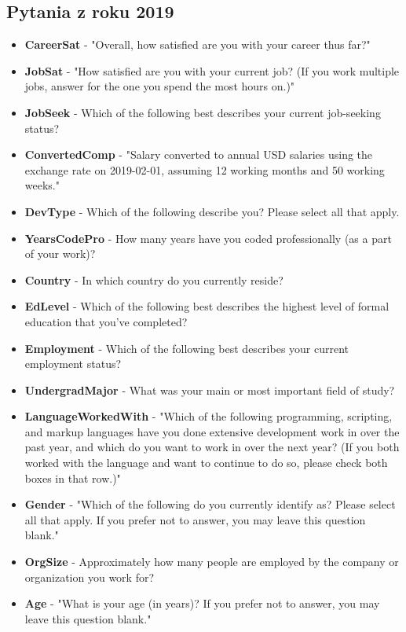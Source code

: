 \begin{appendices}
    \section{Pytania z roku 2019}\label{pytania-2019}
    \begin{itemize}
        \item \textbf{CareerSat} - "Overall, how satisfied are you with your career thus far?"
        \item \textbf{JobSat} - "How satisfied are you with your current job? (If you work multiple jobs, answer for the one you spend the most hours on.)"
        \item \textbf{JobSeek} - Which of the following best describes your current job-seeking status?
        \item \textbf{ConvertedComp} - "Salary converted to annual USD salaries using the exchange rate on 2019-02-01, assuming 12 working months and 50 working weeks."
        \item \textbf{DevType} - Which of the following describe you? Please select all that apply.
        \item \textbf{YearsCodePro} - How many years have you coded professionally (as a part of your work)?
        \item \textbf{Country} - In which country do you currently reside?
        \item \textbf{EdLevel} - Which of the following best describes the highest level of formal education that you’ve completed?
        \item \textbf{Employment} - Which of the following best describes your current employment status?
        \item \textbf{UndergradMajor} - What was your main or most important field of study?
        \item \textbf{LanguageWorkedWith} - "Which of the following programming, scripting, and markup languages have you done extensive development work in over the past year, and which do you want to work in over the next year?  (If you both worked with the language and want to continue to do so, please check both boxes in that row.)"
        \item \textbf{Gender} - "Which of the following do you currently identify as? Please select all that apply. If you prefer not to answer, you may leave this question blank."
        \item \textbf{OrgSize} - Approximately how many people are employed by the company or organization you work for?
        \item \textbf{Age} - "What is your age (in years)? If you prefer not to answer, you may leave this question blank."

\end{itemize}
\end{appendices}
